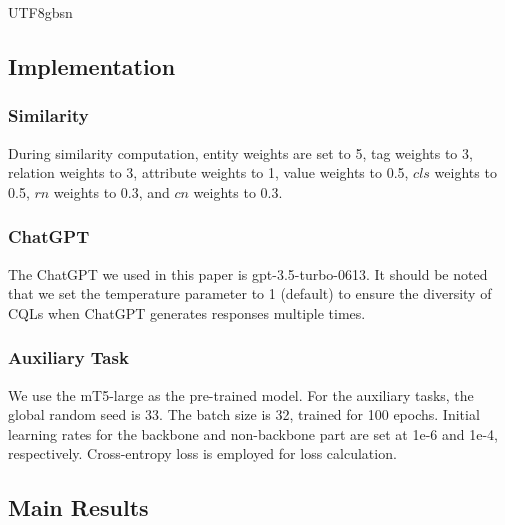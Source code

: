 \documentclass[runningheads]{llncs}
\begin{document}
\begin{CJK*}{UTF8}{gbsn}
\subsection{Implementation}

\subsubsection{Similarity}
During similarity computation, entity weights are set to 5, tag weights to 3, relation weights to 3, attribute weights to 1, value weights to 0.5, $cls$ weights to 0.5, $rn$ weights to 0.3, and $cn$ weights to 0.3.

\subsubsection{ChatGPT}
The ChatGPT we used in this paper is \textsf{gpt-3.5-turbo-0613}. 
It should be noted that we set the temperature parameter to 1 (default) to ensure the diversity of CQLs when ChatGPT generates responses multiple times.

\subsubsection{Auxiliary Task}
\label{aux_task_setting}
We use the \textsf{mT5-large} as the pre-trained model. 
For the auxiliary tasks, the global random seed is 33. 
The batch size is 32, trained for 100 epochs. 
Initial learning rates for the backbone and non-backbone part are set at 1e-6 and 1e-4, respectively. 
Cross-entropy loss is employed for loss calculation.


\subsection{Main Results}


\end{CJK*}
\end{document}
